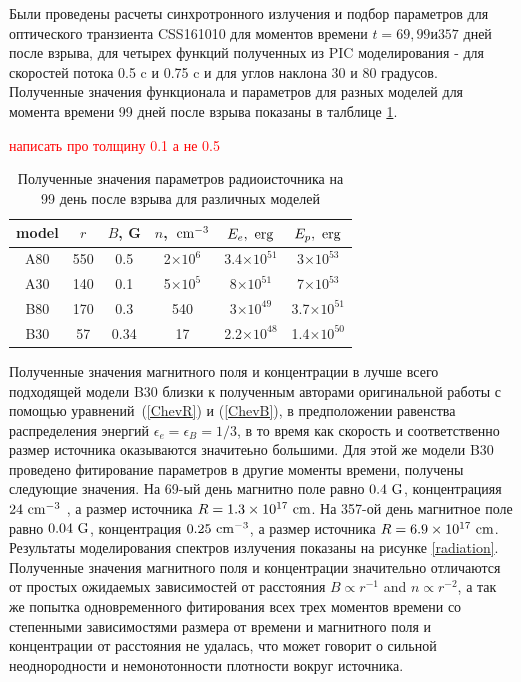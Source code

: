 Были проведены расчеты синхротронного излучения и подбор параметров для оптического транзиента CSS161010 для моментов времени $\displaystyle t = 69, 99 и 357$ дней после взрыва, для четырех функций полученных из PIC моделирования - для скоростей потока 0.5 c и 0.75 c и для углов наклона 30 и 80 градусов. Полученные значения функционала и параметров для разных моделей для момента времени 99 дней после взрыва показаны в талблице \ref{parameters}.

\textcolor{red}{написать про толщину 0.1 а не 0.5}

\renewcommand{\arraystretch}{1.375}
\begin{table}[h!]
	\label{parameters}
	\caption{Полученные значения параметров радиоисточника  на 99 день после взрыва для различных моделей}
	\begin{center}
		\begin{tabular}{|c | c| c| c| c| c|}
			\hline
			model &$r$ & $B$, G& $n$,~$\rm cm^{-3}$&  $E_e,~\rm erg$& $E_p,~\rm erg$\\
			\hline
			A80 & 550 & 0.5 & 2$\times 10^6$  & 3.4$\times 10^{51}$ & 3$\times 10^{53}$\\
			\hline
			A30 & 140 & 0.1& 5$\times 10^5$&  8$\times 10^{51}$ & 7$\times 10^{53}$\\
			\hline
			B80 & 170 & 0.3& 540&  3$\times 10^{49}$& 3.7$\times 10^{51}$\\
			\hline
			B30 & 57 & 0.34& 17&  2.2$\times 10^{48}$& 1.4$\times 10^{50}$\\
			\hline
		\end{tabular}
	\end{center}
\end{table}

Полученные значения магнитного поля и концентрации в лучше всего подходящей модели B30 близки к полученным авторами оригинальной работы \cite{Coppejans2020} с помощью уравнений~(\ref{ChevR})
и (\ref{ChevB}), в предположении равенства распределения энергий $\epsilon_e = \epsilon_B = 1/3$, в то время как скорость и соответственно размер источника оказываются значитеьно большими.
Для этой же модели B30 проведено фитирование параметров в другие моменты времени, получены следующие значения. На 69-ый день магнитно поле равно $0.4~\rm G$, концентрацияя $24~\rm cm^{-3}$ , а размер источника $R =1.3\times10^{17}~\rm{cm}$. На 357-ой день магнитное поле равно $0.04~\rm G$, концентрация $0.25~\rm cm^{-3}$, а размер источника $R= 6.9\times10^{17}~\rm{cm}$. Результаты моделирования спектров излучения показаны на рисунке \ref{radiation}. Полученные значения магнитного поля и концентрации значительно отличаются от простых ожидаемых зависимостей от расстояния $B \propto r^{-1}$ and $n  \propto r^{-2}$, а так же попытка одновременного фитирования всех трех моментов времени со степенными зависимостями размера от времени и магнитного поля и концентрации от расстояния не удалась, что может говорит о сильной неоднородности и немонотонности плотности вокруг источника.

